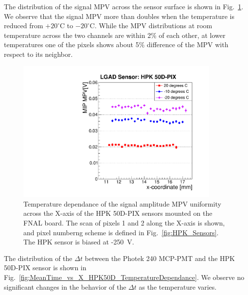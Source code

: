 \documentclass[preprint,1p]{elsarticle}
\begin{document}
The distribution of the signal MPV across the sensor surface is shown in
Fig.~\ref{fig:MPV_vs_X_HPK50D_TemperatureDependance}. We observe that the signal
MPV more than doubles when the temperature is reduced from $+20^{\circ}$C to
$-20^{\circ}$C. While the MPV distributions at room temperature across the two
channels are within 2\% of each other, at lower temperatures one of the pixels
shows about 5\% difference of the MPV with respect to its neighbor. 

\begin{figure}[htbp] 
\centering
\includegraphics[width=0.9\textwidth]{figs/FNAL_MPV_vs_X_HPK50D_TemperatureDependance.pdf} 
\caption{Temperature dependance of the signal amplitude MPV uniformity across
the X-axis of the HPK 50D-PIX sensors mounted on the FNAL board. The scan of
pixels 1 and 2 along the X-axis is shown, and pixel numberng scheme is defined
in Fig.~\ref{fig:HPK_Sensors}. The HPK sensor is biased at -250~V.} 
\label{fig:MPV_vs_X_HPK50D_TemperatureDependance} 
\end{figure} 

The distribution of the $\Delta t$ between the Photek 240 MCP-PMT and the HPK
50D-PIX sensor is shown in
Fig.~\ref{fig:MeanTime_vs_X_HPK50D_TemperatureDependance}. We observe no
significant changes in the behavior of the $\Delta t$ as the temperature varies. 
\end{document}
